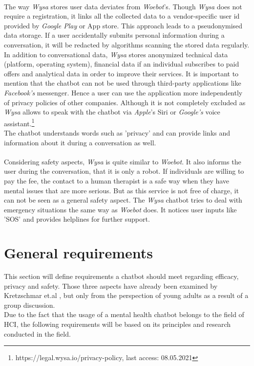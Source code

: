 \documentclass[sigconf, nonacm]{acmart}
\begin{document}
\\
The way \emph{Wysa} stores user data deviates from \emph{Woebot}'s. Though \emph{Wysa} does not require a registration, it links all the collected data to a vendor-specific user id provided by \emph{Google Play} or App store. This approach leads to a pseudonymised data storage.
If a user accidentally submits personal information during a conversation, it will be redacted by algorithms scanning the stored data regularly. In addition to conversational data, \emph{Wysa} stores anonymized technical data (platform, operating system), 
financial data if an individual subscribes to paid offers and analytical data in order to improve their services. 
It is important to mention that the chatbot can not be used through third-party applications like \emph{Facebook's} messenger. Hence a user can use the application more independently of privacy policies of other companies. Although it is not completely excluded as \emph{Wysa} allows to speak with the chatbot 
via \emph{Apple}'s Siri or \emph{Google's} voice assistant.\footnote{https://legal.wysa.io/privacy-policy, last access: 08.05.2021}
\\
The chatbot understands words such as 'privacy' and can provide links and information about it during a conversation as well.\cite{Kretzschmar2019}
\\\\
Considering safety aspects, \emph{Wysa} is quite similar to \emph{Woebot}. It also informs the user during the conversation, that it is only a robot. If individuals are willing to pay the fee, the contact to a human therapist is a safe way when they have mental issues that are 
more serious. But as this service is not free of charge, it can not be seen as a general safety aspect. The \emph{Wysa} chatbot tries to deal with emergency situations the same way as \emph{Woebot} does. It notices user inputs like 'SOS' and provides helplines for further support.\cite{Kretzschmar2019}
\section{General requirements}
\label{sec:three}
This section will define requirements a chatbot should meet regarding efficacy, privacy and safety. Those three aspects have already been examined by Kretzschmar et.al \cite{Kretzschmar2019}, but only from the perspection of young adults as a result of a group discussion.
\\
Due to the fact that the usage of a mental health chatbot belongs to the field of HCI, the following requirements will be based on its principles and research conducted in the field.
\end{document}
